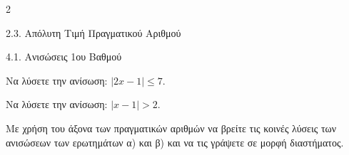 \begin{ylh}{2}
    \item 2.3. Απόλυτη Τιμή Πραγματικού Αριθμού
    \item 4.1. Ανισώσεις 1ου Βαθμού
\end{ylh}

\begin{alist}
\item Να λύσετε την ανίσωση: $|2x - 1| \le 7$.
\item Nα λύσετε την ανίσωση: $|x - 1| > 2$.
\item Με χρήση του άξονα των πραγματικών αριθμών να βρείτε τις κοινές λύσεις των ανισώσεων των ερωτημάτων α) και β) και να τις γράψετε σε μορφή διαστήματος.
\end{alist}

